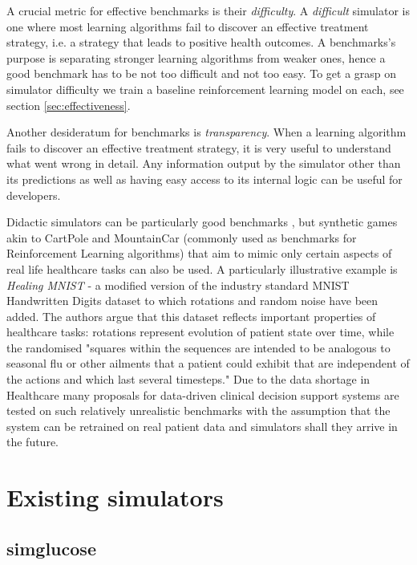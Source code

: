 A crucial metric for effective benchmarks is their \emph{difficulty}. 
A \emph{difficult} simulator is one where most learning algorithms fail to discover an effective treatment strategy, i.e. a strategy that leads to positive health outcomes.
A benchmarks's purpose is separating stronger learning algorithms from weaker ones, hence a good benchmark has to be not too difficult and not too easy.
To get a grasp on simulator difficulty we train a baseline reinforcement learning model on each, see section \ref{sec:effectiveness}.

Another desideratum for benchmarks is \emph{transparency}.
When a learning algorithm fails to discover an effective treatment strategy, it is very useful to understand what went wrong in detail.
Any information output by the simulator other than its predictions as well as having easy access to its internal logic can be useful for developers.

Didactic simulators can be particularly good benchmarks \cite{anthropodidactic}, but synthetic games akin to CartPole \cite{cartpole} and MountainCar \cite{mountaincar} (commonly used as benchmarks for Reinforcement Learning algorithms) that aim to mimic only certain aspects of real life healthcare tasks can also be used.
A particularly illustrative example is \emph{Healing MNIST} \cite{healing-mnist} - a modified version of the industry standard MNIST Handwritten Digits \cite{mnist} dataset to which rotations and random noise have been added.
The authors argue that this dataset reflects important properties of healthcare tasks: rotations represent evolution of patient state over time, while the randomised "squares within the sequences are intended to be analogous to seasonal flu or other ailments that a patient could exhibit that are independent of the actions and which last several timesteps."
Due to the data shortage in Healthcare many proposals for data-driven clinical decision support systems are tested on such relatively unrealistic benchmarks with the assumption that the system can be retrained on real patient data and simulators shall they arrive in the future.

\section{Existing simulators}
\label{sec:existing}

\subsection{simglucose}
\label{sec:simglucose}


